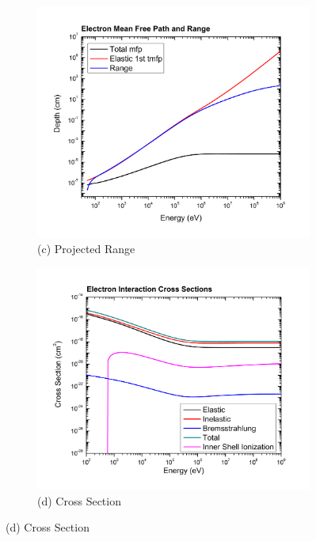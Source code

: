 \documentclass[11pt]{article} %
\begin{document}
\begin{figure}[ht]
\begin{subfigure}[h]{0.5\textwidth}
			\includegraphics[width=\textwidth]{elec_range.png}
			\caption{(c) Projected Range}
		\end{subfigure}
		\begin{subfigure}[h]{0.5\textwidth}
			\includegraphics[width=\textwidth]{elec_xsec.png}
			\caption{(d) Cross Section}
		\end{subfigure}

\end{figure}
\end{document}
